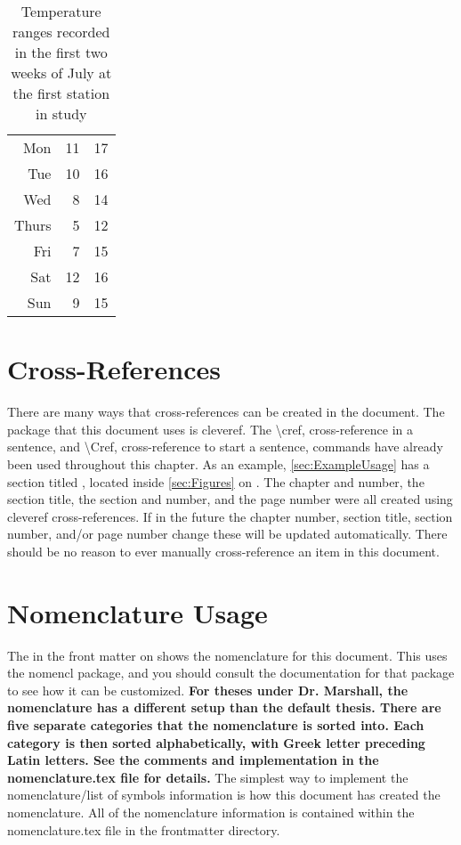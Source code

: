 \begin{table}
\begin{subtable}[h]{0.375\textwidth}
\begin{tabular}{r r r}
                Mon   & 11 & 17 \\
                Tue   & 10 & 16 \\
                Wed   & 8  & 14 \\
                Thurs & 5  & 12 \\
                Fri   & 7  & 15 \\
                Sat   & 12 & 16 \\
                Sun   & 9  & 15 \\
                \hline
            \end{tabular}
        \end{subtable}
        \captionsetup{width=4.6in}
        \caption{Temperature ranges recorded in the first two weeks of July at the first station in study}
        \label{tab:temps}
    \end{table}

\section{Cross-References} \label{sec:CrossReferences}
    There are many ways that cross-references can be created in the document.
    The package that this document uses is cleveref.
    The \textbackslash cref, cross-reference in a sentence, and \textbackslash Cref, cross-reference to start a sentence, commands have already been used throughout this chapter.
    As an example, \cref{sec:ExampleUsage} has a section titled , located inside \cref{sec:Figures} on .
    The chapter and number, the section title, the section and number, and the page number were all created using cleveref cross-references.
    If in the future the chapter number, section title, section number, and/or page number change these will be updated automatically.
    There should be no reason to ever manually cross-reference an item in this document.

\section{Nomenclature Usage} \label{sec:NomenclatureUsage}
    The  in the front matter on  shows the nomenclature for this document.
    This uses the nomencl package, and you should consult the documentation for that package to see how it can be customized.
    \textbf{
    For theses under Dr. Marshall, the nomenclature has a different setup than the default thesis.
    There are five separate categories that the nomenclature is sorted into.
    Each category is then sorted alphabetically, with Greek letter preceding Latin letters.
    See the comments and implementation in the nomenclature.tex file for details.
    }
    The simplest way to implement the nomenclature/list of symbols information is how this document has created the nomenclature.
    All of the nomenclature information is contained within the nomenclature.tex file in the frontmatter directory.

